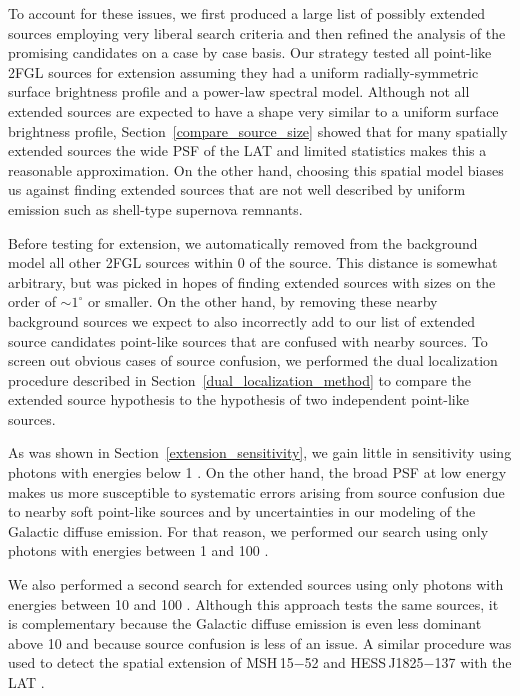 \documentclass[12pt,preprint]{aastex}
\newcommand{\gev}{\text{GeV}\xspace}
\newcommand{\degree}{^\circ\xspace}
\begin{document}
To account for these issues, we first produced a large list of possibly
extended sources employing very liberal search criteria and then
refined the analysis of the promising candidates on a case by case basis.
Our strategy tested all point-like 2FGL sources for extension assuming
they had a uniform radially-symmetric surface brightness profile
and a power-law spectral model.  Although not all extended sources are
expected to have a shape very similar to a uniform surface brightness
profile, Section~\ref{compare_source_size} showed that for many spatially
extended sources the wide PSF of the LAT and limited statistics makes
this a reasonable approximation.  On the other hand, choosing this
spatial model biases us against finding extended sources that are not
well described by uniform emission such as shell-type supernova remnants.

Before testing for extension, we automatically removed from the background
model all other 2FGL sources within 0 of the source.  This distance
is somewhat arbitrary, but was picked in hopes of finding extended
sources with sizes on the order of $\sim1\degree$ or smaller. On the
other hand, by removing these nearby background sources we expect to
also incorrectly add to our list of extended source candidates
point-like sources that
are confused with nearby sources.  To screen out obvious cases of source
confusion, we performed the dual localization procedure described in
Section~\ref{dual_localization_method} to compare the extended source
hypothesis to the hypothesis of two independent point-like sources.

As was shown in Section~\ref{extension_sensitivity}, we gain little in
sensitivity using photons with energies below 1 \gev. On the other hand,
the broad PSF at low energy makes us more susceptible to systematic
errors arising from source confusion due to nearby soft point-like sources
and by uncertainties in our modeling of the Galactic diffuse emission. 
For that reason,
we performed our search using only photons with energies between 1 \gev
and 100 \gev.

We also performed a second search for extended sources using only
photons with energies between 10 \gev and 100 \gev.  Although this
approach tests the same sources, it is complementary because the Galactic
diffuse emission is even less dominant above 10 \gev and because source
confusion is less of an issue.  A similar procedure was used to detect
the spatial extension of MSH\,15$-$52 and
HESS\,J1825$-$137 with the LAT \citep{msh1552,fermi_hess_j1825}.
\end{document}
